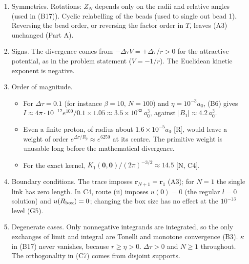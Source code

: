 \documentclass[11pt,a4paper]{article}
\providecommand{\tightlist}{\setlength{\itemsep}{0pt}\setlength{\parskip}{0pt}}
\begin{document}
\begin{enumerate}
  \begin{itemize}
  \tightlist
  \item
    \(V=0\): (A3) becomes \(\operatorname{Tr}e^{-\beta K}=\infty\), by volume alone, and its localised version is finite, consistent with (B11) as \(\delta\to0\).
  \item
    \(N=1\): \(Z_1=(2\pi\beta)^{-3/2}\int d^3r\,e^{\beta/r}\) is infinite at both ends, consistent with (B9) and (B13).
  \item
    Repulsive \(V=+1/r\): the integrand is bounded by its kinetic part and the localised trace is finite. The proof of (B9) breaks exactly at the step \(w\ge1\), where it should.
  \end{itemize}
\item
  Symmetries. Rotations: \(Z_N\) depends only on the radii and relative angles (used in (B17)). Cyclic relabelling of the beads (used to single out bead 1). Reversing the bead order, or reversing the factor order in \(T\), leaves (A3) unchanged (Part A).
\item
  Signs. The divergence comes from \(-\Delta\tau V=+\Delta\tau/r>0\) for the attractive potential, as in the problem statement (\(V=-1/r\)). The Euclidean kinetic exponent is negative.
\item
  Order of magnitude.

  \begin{itemize}
  \tightlist
  \item
    For \(\Delta\tau=0.1\) (for instance \(\beta=10\), \(N=100\)) and \(\eta=10^{-3}a_0\), (B6) gives \(I\approx4\pi\cdot10^{-12}e^{100}/0.1\times1.05\approx3.5\times10^{33}\,a_0^3\), against \(|B_1|\approx4.2\,a_0^3\).
  \item
    Even a finite proton, of radius about \(1.6\times10^{-5}a_0\) {[}R{]}, would leave a weight of order \(e^{\Delta\tau/R_p}\approx e^{6250}\) at its centre. The primitive weight is unusable long before the mathematical divergence.
  \item
    For the exact kernel, \(K_1(\mathbf 0,\mathbf 0)/(2\pi)^{-3/2}\approx14.5\) {[}N, C4{]}.
  \end{itemize}
\item
  Boundary conditions. The trace imposes \(\mathbf r_{N+1}=\mathbf r_1\) (A3); for \(N=1\) the single link has zero length. In C4, route (ii) imposes \(u(0)=0\) (the regular \(l=0\) solution) and \(u(R_{\rm box})=0\); changing the box size has no effect at the \(10^{-13}\) level (G5).
\item
  Degenerate cases. Only nonnegative integrands are integrated, so the only exchanges of limit and integral are Tonelli and monotone convergence (B3). \(\kappa\) in (B17) never vanishes, because \(r\ge\eta>0\). \(\Delta\tau>0\) and \(N\ge1\) throughout. The orthogonality in (C7) comes from disjoint supports.
\end{enumerate}
\end{document}
